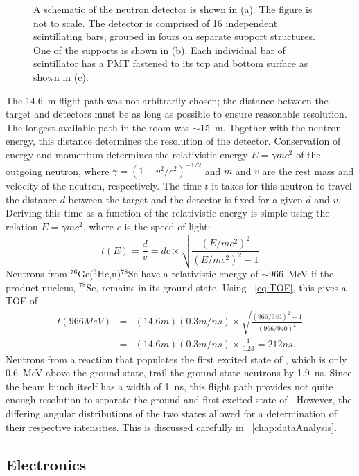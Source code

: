 \begin{figure}[htp]
{}
\caption{A schematic of the neutron detector is shown in (a).  The figure is not to scale.  The detector is comprised of 16 independent scintillating bars, grouped in fours on separate support structures.  One of the supports is shown in (b).  Each individual bar of scintillator has a PMT fastened to its top and bottom surface as shown in (c).}
\label{fig:detectorGeometry}
\end{figure}

The 14.6~m flight path was not arbitrarily chosen; the distance between the target and detectors must be as long as possible to ensure reasonable resolution.  The longest available path in the room was $\sim$15~m.  Together with the neutron energy, this distance determines the resolution of the detector.  Conservation of energy and momentum determines the relativistic energy $E = \gamma m c^2$ of the outgoing neutron, where $\gamma=(1-v^2/c^2)^{-1/2}$ and $m$ and $v$ are the rest mass and velocity of the neutron, respectively.  The time $t$ it takes for this neutron to travel the distance $d$ between the target and the detector is fixed for a given $d$ and $v$.  Deriving this time as a function of the relativistic energy is simple using the relation $E=\gamma mc^2$, where $c$ is the speed of light:
\begin{equation}
t(E) = \frac{d}{v} =  dc\times\sqrt{\frac{(E/mc^2)^2}{(E/mc^2)^2-1}} 
\label{eq:TOF}
\end{equation}
Neutrons from $^{76}$Ge($^3$He,n)$^{78}$Se have a relativistic energy of $\sim$966~MeV if the product nucleus, $^{78}$Se, remains in its ground state.  Using {\eqn}~\ref{eq:TOF}, this gives a TOF of
\begin{eqnarray}
t(966 MeV) &=& (14.6 m)(0.3 m/ns)\times\sqrt{\frac{(966/940)^2-1}{(966/940)^2}} \nonumber \\
           &=& (14.6 m)(0.3 m/ns)\times\frac{1}{0.23} = 212 ns \nonumber.
\end{eqnarray}
Neutrons from a reaction that populates the first excited state of , which is only 0.6~MeV above the ground state, trail the ground-state neutrons by 1.9~ns.  Since the beam bunch itself has a width of 1~ns, this flight path provides not quite enough resolution to separate the ground and first excited state of \GeTargets. However, the differing angular distributions of the two states allowed for a determination of their respective intensities.  This is discussed carefully in {\chap}~\ref{chap:dataAnalysis}.


\subsection{Electronics}
\label{sec:electronics}

